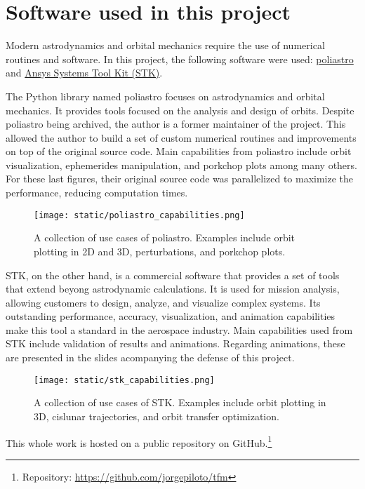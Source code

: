 \section{Software used in this project}

Modern astrodynamics and orbital mechanics require the use of numerical routines
and software. In this project, the following software were used:
\href{https://github.com/poliastro/poliastro}{poliastro} and
\href{https://www.ansys.com/products/missions/ansys-stk}{Ansys Systems Tool Kit
  (STK)}.

The Python library named poliastro focuses on astrodynamics and orbital
mechanics. It provides tools focused on the analysis and design of orbits.
Despite poliastro being archived, the author is a former maintainer of the
project. This allowed the author to build a set of custom numerical routines and
improvements on top of the original source code. Main capabilities from
poliastro include orbit visualization, ephemerides manipulation, and porkchop
plots among many others. For these last figures, their original source code was
parallelized to maximize the performance, reducing computation times.

\vspace{1cm}
\begin{figure}[H] \centering
  \texttt{[image: static/poliastro\_capabilities.png]}
  \caption[A collection of use cases of poliastro.]{A collection of use
    cases of poliastro. Examples include orbit plotting in 2D and 3D,
    perturbations, and porkchop plots.}
  \label{fig:poliastro_capabilities}
\end{figure}

STK, on the other hand, is a commercial software that provides a set of tools
that extend beyong astrodynamic calculations. It is used for mission analysis,
allowing customers to design, analyze, and visualize complex systems. Its
outstanding performance, accuracy, visualization, and animation capabilities
make this tool a standard in the aerospace industry. Main capabilities used from
STK include validation of results and animations. Regarding animations, these
are presented in the slides acompanying the defense of this project.

\vspace{1cm}
\begin{figure}[H] \centering
  \texttt{[image: static/stk\_capabilities.png]}
  \caption[A collection of use cases of STK.]{A collection of use
    cases of STK. Examples include orbit plotting in 3D, cislunar
    trajectories, and orbit transfer optimization.}
  \label{fig:stk_capabilities}
\end{figure}

This whole work is hosted on a public repository on GitHub.\footnote{Repository:
\href{https://github.com/jorgepiloto/tfm}{https://github.com/jorgepiloto/tfm}}
